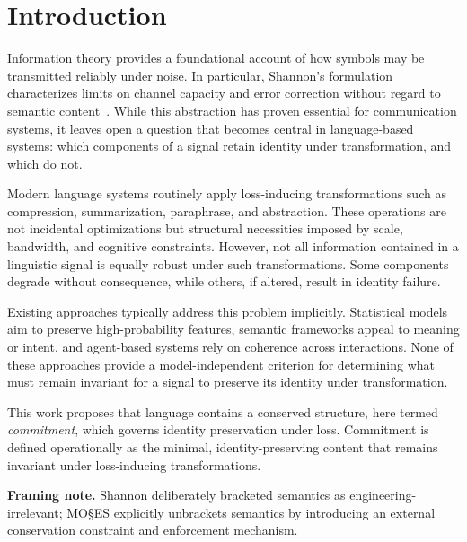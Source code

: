 \documentclass[11pt,a4paper]{article}
\begin{document}
\newpage

\section{Introduction}

Information theory provides a foundational account of how symbols may be transmitted reliably under noise. In particular, Shannon's formulation characterizes limits on channel capacity and error correction without regard to semantic content~\cite{shannon1948}. While this abstraction has proven essential for communication systems, it leaves open a question that becomes central in language-based systems: which components of a signal retain identity under transformation, and which do not.

Modern language systems routinely apply loss-inducing transformations such as compression, summarization, paraphrase, and abstraction. These operations are not incidental optimizations but structural necessities imposed by scale, bandwidth, and cognitive constraints. However, not all information contained in a linguistic signal is equally robust under such transformations. Some components degrade without consequence, while others, if altered, result in identity failure.

Existing approaches typically address this problem implicitly. Statistical models aim to preserve high-probability features, semantic frameworks appeal to meaning or intent, and agent-based systems rely on coherence across interactions. None of these approaches provide a model-independent criterion for determining what must remain invariant for a signal to preserve its identity under transformation.

This work proposes that language contains a conserved structure, here termed \emph{commitment}, which governs identity preservation under loss. Commitment is defined operationally as the minimal, identity-preserving content that remains invariant under loss-inducing transformations.

\noindent\textbf{Framing note.} Shannon deliberately bracketed semantics as engineering-irrelevant; MO\S{}ES\texttrademark{} explicitly unbrackets semantics by introducing an external conservation constraint and enforcement mechanism.
\end{document}
